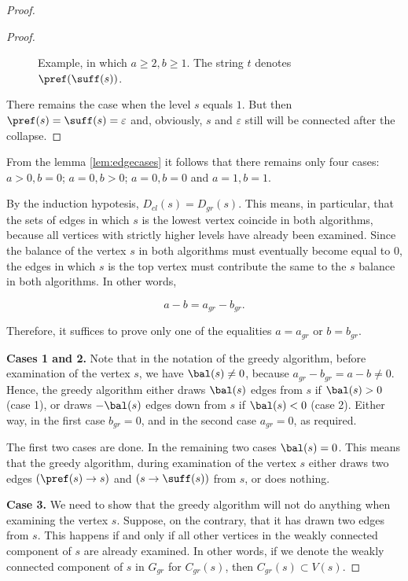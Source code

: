 \begin{proof}
\begin{proof}
\begin{figure}[ht]
\caption{Example, in which $a \ge 2, b \ge 1$. The string $t$ denotes $\pref(\suff(s))$.}\label{fig:collapsea2b1}
\end{figure}
There remains the case when the level $s$ equals $1$. But then $ \pref (s) = \suff (s) = \varepsilon $ and, obviously, $s$ and $ \varepsilon $ still will be connected after the collapse.
\end{proof}

From the lemma \ref{lem:edgecases} it follows that there remains only four cases: $ a> 0, b = 0 $; $ a = 0, b> 0 $; $ a = 0, b = 0 $ and $ a = 1, b = 1 $.

By the induction hypotesis, $ D_{cl} (s) = D_{gr} (s) $. This means, in particular, that the sets of edges in which $ s $ is the lowest vertex coincide in both algorithms, because all vertices with strictly higher levels have already been examined. Since the balance of the vertex $s$ in both algorithms must eventually become equal to $ 0 $, the edges in which $ s $ is the top vertex must contribute the same to the $ s $ balance in both algorithms. In other words,

\begin{equation}
\label{eqn:balance}
    a-b = a_{gr}-b_{gr}.
\end{equation}

Therefore, it suffices to prove only one of the equalities $ a = a_{gr} $ or $ b = b_{gr} $.

\textbf {Cases 1 and 2.} Note that in the notation of the greedy algorithm, before examination of the vertex $ s $, we have $ \bal (s) \ne 0 $, because $ a_{gr} - b_{gr} = a-b \ne 0 $. Hence, the greedy algorithm either draws $ \bal (s) $ edges from $ s $ if $ \bal (s)> 0 $ (case 1), or draws $ - \bal (s) $ edges down from $ s $ if $ \bal (s) <0 $ (case 2). Either way, in the first case $ b_{gr} = 0 $, and in the second case $ a_{gr} = 0 $, as required.

The first two cases are done. In the remaining two cases $ \bal (s) = 0 $. This means that the greedy algorithm, during examination of the vertex $ s $ either draws two edges $ (\pref (s) \to s) $ and $ (s \to \suff (s)) $ from $ s $, or does nothing.

\textbf {Case 3.} We need to show that the greedy algorithm will not do anything when examining the vertex $ s $. Suppose, on the contrary, that it has drawn two edges from $ s $. This happens if and only if all other vertices in the weakly connected component of $ s $ are already examined. In other words, if we denote the weakly connected component of $ s $ in $ G_{gr} $ for $ C_{gr} (s) $, then $ C_{gr} (s) \subset V (s) $.


\end{proof}
